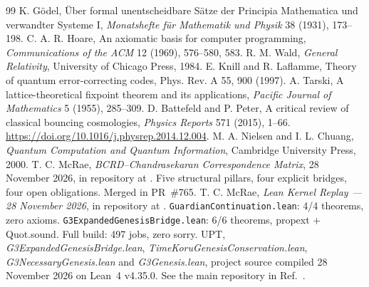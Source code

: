 \documentclass[11pt,a4paper]{article}
\begin{document}
\begin{thebibliography}{99}
 K. Gödel, Über formal unentscheidbare Sätze der Principia Mathematica und verwandter Systeme I, \emph{Monatshefte für Mathematik und Physik} 38 (1931), 173--198.
 C. A. R. Hoare, An axiomatic basis for computer programming, \emph{Communications of the ACM} 12 (1969), 576--580, 583.
 R. M. Wald, \emph{General Relativity}, University of Chicago Press, 1984.
 E. Knill and R. Laflamme, Theory of quantum error-correcting codes, Phys. Rev. A 55, 900 (1997).
 A. Tarski, A lattice-theoretical fixpoint theorem and its applications, \emph{Pacific Journal of Mathematics} 5 (1955), 285--309.
 D. Battefeld and P. Peter, A critical review of classical bouncing cosmologies, \emph{Physics Reports} 571 (2015), 1--66. \url{https://doi.org/10.1016/j.physrep.2014.12.004}.
 M. A. Nielsen and I. L. Chuang, \emph{Quantum Computation and Quantum Information}, Cambridge University Press, 2000.
 T. C. McRae, \emph{BCRD--Chandrasekaran Correspondence Matrix}, 28 November 2026, in repository at . Five structural pillars, four explicit bridges, four open obligations. Merged in PR~\#765.
 T. C. McRae, \emph{Lean Kernel Replay --- 28 November 2026}, in repository at . \texttt{GuardianContinuation.lean}: 4/4 theorems, zero axioms. \texttt{G3ExpandedGenesisBridge.lean}: 6/6 theorems, propext + Quot.sound. Full build: 497 jobs, zero sorry.
 UPT, \emph{G3ExpandedGenesisBridge.lean}, \emph{TimeKoruGenesisConservation.lean}, \emph{G3NecessaryGenesis.lean} and \emph{G3Genesis.lean}, project source compiled 28 November 2026 on Lean~4 v4.35.0. See the main repository in Ref.~\cite{upt}.
\end{thebibliography}
\end{document}
